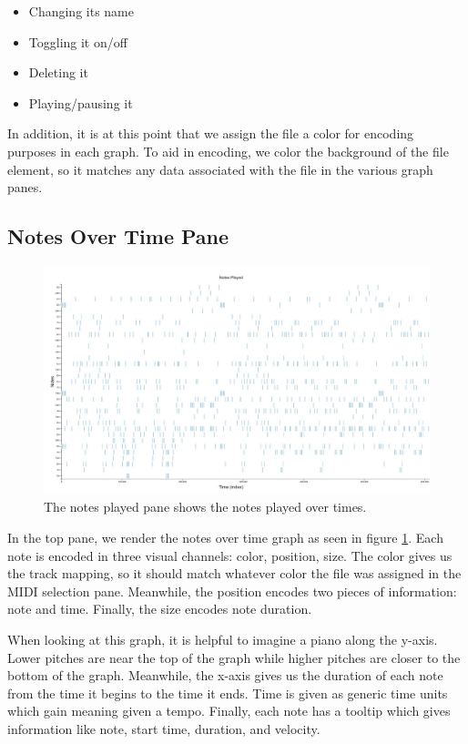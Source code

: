 \documentclass[journal]{vgtc}                %
\begin{document}
\begin{itemize}
  \item Changing its name
  \item Toggling it on/off
  \item Deleting it
  \item Playing/pausing it
\end{itemize}

In addition, it is at this point that we assign the file a color for encoding
purposes in each graph. To aid in encoding, we color the background of the
file element, so it matches any data associated with the file in the various
graph panes.

\subsection{Notes Over Time Pane}

\begin{figure}[h]
  \centering
  \includegraphics[width=\columnwidth]{notes-played-single-track}
  \caption{The notes played pane shows the notes played over times.}
  \label{fig:notes-played}
\end{figure}

In the top pane, we render the notes over time graph as seen in figure
\ref{fig:notes-played}. Each note is encoded in three visual channels: color,
position, size. The color gives us the track mapping, so it should match
whatever color the file was assigned in the MIDI selection pane. Meanwhile, the
position encodes two pieces of information: note and time. Finally, the size
encodes note duration.

When looking at this graph, it is helpful to imagine a piano along the y-axis.
Lower pitches are near the top of the graph while higher pitches are closer to the
bottom of the graph. Meanwhile, the x-axis gives us the duration of each note
from the time it begins to the time it ends. Time is given as generic time units
which gain meaning given a tempo. Finally, each note has a tooltip which gives
information like note, start time, duration, and velocity.
\end{document}
